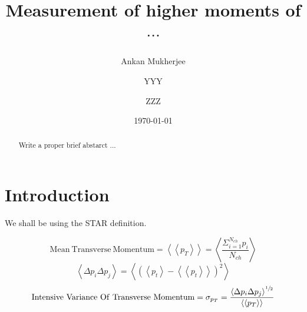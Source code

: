 \documentclass[letterpaper,aps,prc,superscriptaddress,nofootinbib,10pt,showpacs,floatfix]{revtex4-2}%
\newcommand{\bfrac}[2]{\frac{\displaystyle #1}{\displaystyle #2}}
\begin{document}
\title{ Measurement of higher moments of   $\cdots$}
\author{Ankan Mukherjee} 
\author{YYY}
\author{ZZZ}



\date{\today}  



\begin{abstract}

Write a proper brief abstarct ...
\end{abstract}

\maketitle

\section{Introduction}





We shall be using the STAR definition. 

\begin{equation}
\label{eq:1}
\mathrm{Mean\ Transverse\ Momentum}=\left<\left<p_T\right>\right>=\left<\bfrac{\Sigma_{i=1}^{N_{ch}} p_i}{N_{ch}}\right>
\end{equation}
\vspace{-5mm}
\begin{equation}
\label{eq:2}
\left<\Delta p_i \Delta p_j\right>=\left<\left(\left<p_t\right>-\left<\left<p_t\right>\right>\right)^2\right>
\end{equation}
\vspace{-5mm}
\begin{equation}
\label{eq:3}
\mathrm{Intensive\ Variance\ Of\ Transverse\ Momentum}=\sigma_{p_T}=\bfrac{\left<\Delta p_i \Delta p_j\right>^{\sfrac{1}{2}}}{\left<\left<p_T\right>\right>}
\end{equation}
\end{document}
